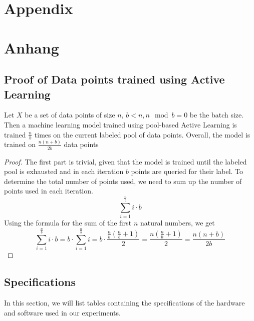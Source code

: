 
{\chapter{Appendix}}    %
{\chapter{Anhang}}      %
\label{chap:appendix}


\section{Proof of Data points trained using Active Learning}
\label{sec:appendix:FirstSection}
\begin{theorem}
Let $X$ be a set of data points of size $n$, $b < n, n \mod b = 0$ be the batch size. Then a machine learning model trained
using pool-based Active Learning is trained $\frac{n}{b}$ times on the current labeled pool of data points. Overall, the model
is trained on $\frac{n(n+b)}{2b}$ data points
\end{theorem}
\begin{proof}
    The first part is trivial, given that the model is trained until the labeled pool is exhausted and in each iteration $b$
    points are queried for their label. To determine the total number of points used, we need to sum up the number of points
    used in each iteration. 
    \begin{equation}
        \sum_{i=1}^{\frac{n}{b}} i \cdot b
    \end{equation}
    Using the formula for the sum of the first $n$ natural numbers, we get
    \begin{equation}
        \sum_{i=1}^{\frac{n}{b}} i \cdot b = b \cdot \sum_{i=1}^{\frac{n}{b}} i = b \cdot \frac{\frac{n}{b} (\frac{n}{b} + 1)}{2}
        = \frac{n (\frac{n}{b} + 1)}{2} = \frac{n(n+b)}{2b}
    \end{equation}
\end{proof}

\section{Specifications}
\label{sec:Appendix:Specifications}
In this section, we will list tables containing the specifications of the hardware and software used in our experiments.

